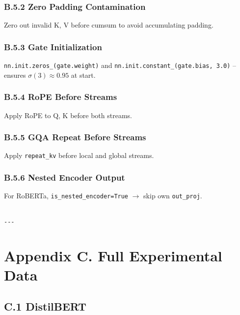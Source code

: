\subsubsection{B.5.2 Zero Padding Contamination}

Zero out invalid K, V before cumsum to avoid accumulating padding.

\subsubsection{B.5.3 Gate Initialization}

\texttt{nn.init.zeros\_(gate.weight)} and \texttt{nn.init.constant\_(gate.bias, 3.0)} -- 
ensures $\sigma(3) \approx 0.95$ at start.

\subsubsection{B.5.4 RoPE Before Streams}

Apply RoPE to Q, K before both streams.

\subsubsection{B.5.5 GQA Repeat Before Streams}

Apply \texttt{repeat\_kv} before local and global streams.

\subsubsection{B.5.6 Nested Encoder Output}

For RoBERTa, \texttt{is\_nested\_encoder=True} $\to$ skip own \texttt{out\_proj}.
\begin{lstlisting}

---
\end{lstlisting}


\section{Appendix C. Full Experimental Data}

\subsection{C.1 DistilBERT}

